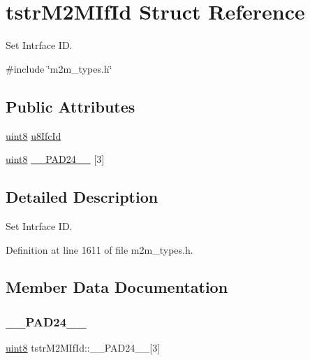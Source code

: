 \hypertarget{structtstrM2MIfId}{}\section{tstr\+M2\+M\+If\+Id Struct Reference}
\label{structtstrM2MIfId}


Set Intrface ID.  




{\ttfamily \#include \char`\"{}m2m\+\_\+types.\+h\char`\"{}}

\subsection*{Public Attributes}
\begin{DoxyCompactItemize}
\item 
\hyperlink{group__DataT_ga4df709a77647e870bbf1d955b8edc9a6}{uint8} \hyperlink{structtstrM2MIfId_a23f316aab7ec1b30d7830e063cc4d149}{u8\+Ifc\+Id}
\item 
\hyperlink{group__DataT_ga4df709a77647e870bbf1d955b8edc9a6}{uint8} \hyperlink{structtstrM2MIfId_a15c80b01feb3931a71832c9e6b6d61c4}{\+\_\+\+\_\+\+P\+A\+D24\+\_\+\+\_\+} \mbox{[}3\mbox{]}
\end{DoxyCompactItemize}


\subsection{Detailed Description}
Set Intrface ID. 

Definition at line 1611 of file m2m\+\_\+types.\+h.



\subsection{Member Data Documentation}
\mbox{\label{structtstrM2MIfId_a15c80b01feb3931a71832c9e6b6d61c4}} 
\subsubsection{\texorpdfstring{\+\_\+\+\_\+\+P\+A\+D24\+\_\+\+\_\+}{\_\_PAD24\_\_}}
{\footnotesize\ttfamily \hyperlink{group__DataT_ga4df709a77647e870bbf1d955b8edc9a6}{uint8} tstr\+M2\+M\+If\+Id\+::\+\_\+\+\_\+\+P\+A\+D24\+\_\+\+\_\+\mbox{[}3\mbox{]}}

